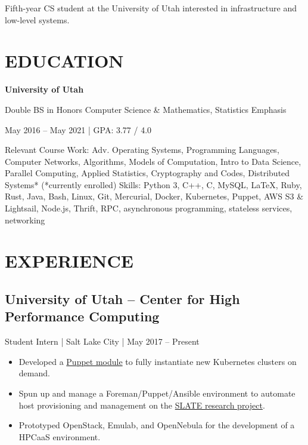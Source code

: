 \documentclass[10pt, letterpaper]{resume}
\begin{document}
\maketitle

{\centering
 Fifth-year CS student at the University of Utah interested in infrastructure and low-level systems.
 \par
}

\section{EDUCATION}
 {\centering
  \textbf{University of Utah}

  Double BS in Honors Computer Science \& Mathematics, Statistics Emphasis

  May 2016 -- May 2021 | GPA: 3.77 / 4.0
  \par
 }
\vspace{10pt}
{{\selectfont Relevant Course Work:}
Adv. Operating Systems, Programming Languages, Computer Networks, Algorithms, Models of Computation, Intro to Data Science, Parallel Computing, Applied Statistics, Cryptography and Codes, Distributed Systems* {\footnotesize(*currently enrolled)}}
\smallbreak%
{{\selectfont Skills:} Python 3, C++, C, MySQL, \LaTeX, Ruby, Rust, Java, Bash, Linux, Git, Mercurial, Docker, Kubernetes, Puppet, AWS S3 \& Lightsail, Node.js, Thrift, RPC, asynchronous programming, stateless services, networking}

\section{EXPERIENCE}
\subsection{University of Utah -- Center for High Performance Computing}
Student Intern | Salt Lake City | May 2017 -- Present
\begin{itemize}
    \item Developed a \href{https://github.com/slateci/slate-puppet}{Puppet module} to fully instantiate new Kubernetes clusters on demand.
 \item Spun up and manage a Foreman/Puppet/Ansible environment to automate host provisioning and management on the \href{https://slateci.io}{SLATE research project}.
 \item Prototyped OpenStack, Emulab, and OpenNebula for the development of a HPCaaS environment.
\end{itemize}
\end{document}
